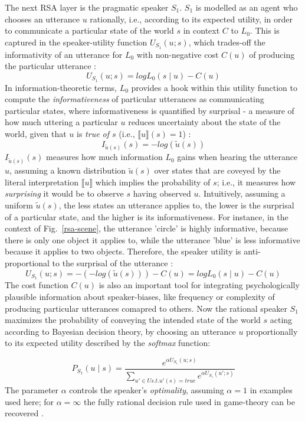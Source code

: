 The next RSA layer is the pragmatic speaker $S_1$. $S_1$ is modelled as an agent who chooses an utterance $u$ rationally, i.e., according to its expected utility, in order to communicate a particular state of the world $s$ in context $C$ to $L_0$. This is captured in the speaker-utility function $U_{S_1}(u; s)$, which trades-off the informativity of an utterance for $L_0$ with non-negative cost $C(u)$ of producing the particular utterance \parencite{problang}:
$$U_{S_1} (u;s) = log L_0(s \mid u) - C(u)$$
In information-theoretic terms, $L_0$ provides a hook within this utility function to compute the \emph{informativeness} of particular utterances as communicating particular states, 
where informativeness is quantified by surprisal - a measure of how much uttering a particular $u$ reduces uncertainty about the state of the world, given that $u$ is \emph{true of $s$} (i.e., $\llbracket u \rrbracket (s) = 1$) \parencite{frank2012predicting}: 
$$I_{ \tilde{u} (s)}(s) = -log(\tilde{u} (s))$$
$I_{\tilde{u} (s)}(s)$ measures how much information $L_0$ gains when hearing the utterance $u$, assuming a known distribution $\tilde{u} (s)$ over states that are coveyed by the literal interpretation $\llbracket u \rrbracket$ which implies the probability of $s$; i.e., it measures how \emph{surprising} it would be to observe $s$ having observed $u$.
Intuitively, assuming a uniform $\tilde{u} (s)$, the less states an utterance applies to, the lower is the surprisal of a particular state, and the higher is its informativeness. For instance, in the context of Fig.~\ref{rsa-scene}, the utterance 'circle' is highly informative, because there is only one object it applies to, while the utterance 'blue' is less informative because it applies to two objects. 
Therefore, the speaker utility is anti-proportional to the surprisal of the utterance \parencite{frank2012predicting}:
$$U_{S_1} (u;s) = -(-log(\tilde{u}(s))) - C(u) = log L_0(s \mid u) - C(u)$$  %
The cost function $C(u)$ is also an important tool for integrating psychologically plausible information about speaker-biases, like frequency or complexity of producing particular utterances comapred to others. Now the rational speaker $S_1$ maximizes the probability of conveying the intended state of the world $s$ acting according to Bayesian decision theory, by choosing an utterance $u$ proportionally to its expected utility described by the \emph{softmax} function:

$$P_{S_1}(u \mid s) = \frac{e^{\alpha U_{S_1} (u; s)}}{\sum_{u' \in U s.t. u'(s) = true} e^{\alpha U_{S_1} (u'; s)}}$$
The parameter $\alpha$ controls the speaker's \emph{optimality}, assuming $\alpha = 1$ in examples used here; for $\alpha = \infty $ the fully rational decision rule used in game-theory can be recovered \parencite{problang, lassiter2017adjectival}.

